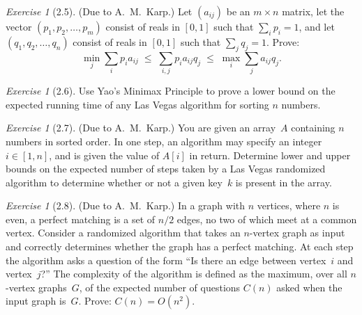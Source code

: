\documentclass[twoside,12pt]{book}
\theoremstyle{plain}
\theoremstyle{definition}
\theoremstyle{remark}
\newtheorem{exercise}[theorem]{Exercise}
\begin{document}
\begin{exercise}[2.5]
(Due to A.~M.~Karp.)  Let $(a_{ij})$ be an $m\times n$ matrix, let the
vector $(p_1,p_2,\ldots,p_m)$ consist of reals in $[0,1]$ such that
$\sum_i p_i=1$, and let $(q_1,q_2,\ldots,q_n)$ consist of reals in $[0,1]$
such that $\sum_j q_j=1$.  Prove:
\[
  \min_j \sum_i p_i a_{ij}
  \;\le\; \sum_{i,j} p_i a_{ij} q_j
  \;\le\; \max_i \sum_j a_{ij} q_j.
\]
\end{exercise}

\begin{exercise}[2.6]
Use Yao's Minimax Principle to prove a lower bound on the expected running
time of any Las Vegas algorithm for sorting $n$ numbers.
\end{exercise}

\begin{exercise}[2.7]
(Due to A.~M.~Karp.)  You are given an array~$A$ containing $n$ numbers in
sorted order.  In one step, an algorithm may specify an integer $i\in[1,n]$,
and is given the value of $A[i]$ in return.  Determine lower and upper bounds
on the expected number of steps taken by a Las Vegas randomized algorithm to
determine whether or not a given key~$k$ is present in the array.
\end{exercise}

\begin{exercise}[2.8]
(Due to A.~M.~Karp.)  In a graph with $n$ vertices, where $n$ is even, a
perfect matching is a set of $n/2$ edges, no two of which meet at a common
vertex.  Consider a randomized algorithm that takes an $n$-vertex graph as
input and correctly determines whether the graph has a perfect matching.  At
each step the algorithm asks a question of the form ``Is there an edge between
vertex~$i$ and vertex~$j$?''  The complexity of the algorithm is defined as
the maximum, over all $n$-vertex graphs~$G$, of the expected number of
questions $C(n)$ asked when the input graph is~$G$.  Prove: $C(n)=O(n^2)$.
\end{exercise}
\end{document}
